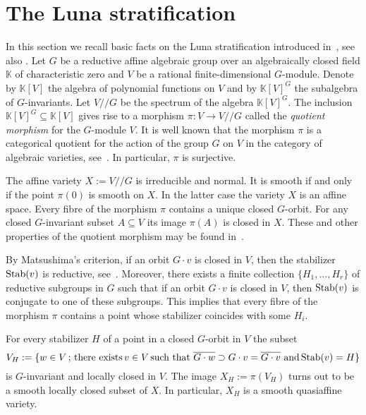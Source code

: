 \documentclass[12pt,a4paper]{amsart}
\theoremstyle{plain}
\theoremstyle{definition}
\begin{document}
\section{The Luna stratification}
\label{sec3}

In this section we recall basic facts on the Luna stratification
introduced in~\cite{Lu73}, see also \cite[Section~6]{PV}.
Let $G$ be a reductive affine algebraic group over
an algebraically closed field ${{\mathbb K}}$ of characteristic zero and
$V$ be a rational finite-dimensional $G$-module. Denote
by ${{\mathbb K}}[V]$ the algebra of polynomial functions on $V$ and
by ${{\mathbb K}}[V]^G$ the subalgebra of $G$-invariants. Let $V/\!/G$
be the spectrum of the algebra ${{\mathbb K}}[V]^G$. The inclusion
${{\mathbb K}}[V]^G\subseteq{{\mathbb K}}[V]$ gives rise to a morphism $\pi \colon
V\to V/\!/G$ called the {\it quotient morphism} for the $G$-module $V$.
It is well known that the morphism $\pi$ is a categorical quotient
for the action of the group $G$ on $V$ in the category of
algebraic varieties, see~\cite[4.6]{PV}. In particular, $\pi$ is surjective.

The affine variety $X:=V/\!/G$ is irreducible and normal.
It is smooth if and only if the point $\pi(0)$ is smooth
on $X$. In the latter case the variety $X$ is an affine
space. Every fibre of the morphism $\pi$ contains a unique closed $G$-orbit.
For any closed $G$-invariant subset $A\subseteq V$ its image $\pi(A)$
is closed in $X$. These and other properties of the quotient morphism
may be found in~\cite[4.6]{PV}.

By Matsushima's criterion, if an orbit $G\cdot v$ is closed
in $V$, then the stabilizer ${\mathop{\rm Stab}}(v)$ is reductive,
see~\cite[4.7]{PV}. Moreover,
there exists a finite collection $\{H_1,\ldots,H_r\}$
of reductive subgroups in $G$ such that if an orbit $G\cdot v$
is closed in $V$, then ${\mathop{\rm Stab}}(v)$ is conjugate to one of these
subgroups. This implies that every fibre of
the morphism $\pi$ contains a point whose stabilizer coincides
with some $H_i$.

For every stabilizer $H$ of a point in a closed $G$-orbit in $V$ the subset
$$
V_H := \{ w\in V \, ; \, \text{there exists}\,
v\in V \, \text{such that} \
\overline{G\cdot w} \supset G\cdot v =\overline{G\cdot v} \
\text{and} \, {\mathop{\rm Stab}}(v)=H\}
$$
is $G$-invariant and locally closed in $V$.
The image $X_H:=\pi(V_H)$ turns out to be a smooth
locally closed subset of $X$. In particular, $X_H$ is
a smooth quasiaffine variety.
\end{document}
